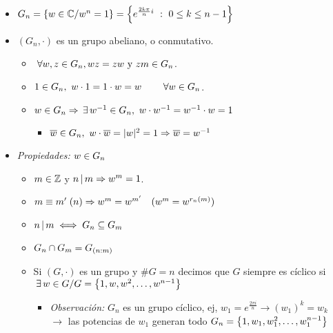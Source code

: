 \begin{itemize}
	\item $G_n = \left\{ w \in \mathbb C / w^n = 1 \right\} = \left\{ e^{\frac{2k \pi}{n} i}\ :\ 0\leq k \leq n-1 \right\}$

	\item $(G_n, \cdot)$ es un grupo abeliano, o conmutativo.
	      \begin{itemize}
		      \item $\;\forall w, z \in G_n, w z = z  w \text{ y } z m \in G_n$.

		      \item $1 \in G_n,\ w \cdot 1 = 1 \cdot w = w \qquad \;\forall w \in G_n$.

		      \item $w \in G_n \Rightarrow \,\exists\, w^{-1} \in G_n,\ w \cdot w^{-1} = w^{-1}\cdot w = 1$
		            \begin{itemize}
			            \item $\overline w \in G_n,\ w \cdot \overline w = |w|^2 = 1 \Rightarrow \overline w = w^{-1}$
		            \end{itemize}
	      \end{itemize}
	\item \textit{Propiedades: $w \in G_n$}
	      \begin{itemize}
		      \item $m \in \mathbb Z$ y $n \, | \, m \Rightarrow w^m = 1$.

		      \item $m \equiv m' \;(n) \Rightarrow w^m = w^{m'}\quad (w^m = w^{r_n(m)})$

		      \item $n \, | \, m \iff G_n \subseteq G_m$

		      \item $G_n \cap G_m = G_{(n:m)}$

		      \item Si $(G, \cdot)$ es un grupo y $\#G = n$ decimos que $G$ siempre es cíclico si
		            $\,\exists\, w\in G / G = \left\{ 1,w, w^2,\dots, w^{n-1} \right\}$\\
		            \begin{itemize}
			            \item \textit{Observación: } $G_n$ es un grupo cíclico, ej, $w_1 = e^\frac{2\pi i}{n} \to (w_1)^k = w_k$\\
			                  $\to$ las potencias de $w_1$ generan todo $G_n = \left\{ 1, w_1, w_1^2,\dots,w_1^{n-1} \right\}$
		            \end{itemize}


\end{itemize}
\end{itemize}
